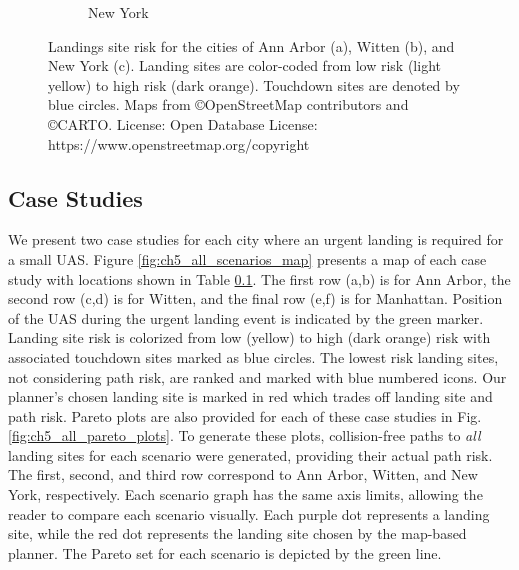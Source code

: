 \begin{figure}[!t]
\begin{subfigure}[b]{0.44\textwidth}
   \caption{New York}\label{fig:ch5_ny_all_risk}
 \end{subfigure}
 \caption[Map of landing site risk]{Landings site risk for the cities of Ann Arbor (a), Witten (b), and New York (c). Landing sites are color-coded from low risk (light yellow) to high risk (dark orange). Touchdown sites are denoted by blue circles. Maps from \copyright OpenStreetMap contributors and \copyright CARTO. License: Open Database License: https://www.openstreetmap.org/copyright}\label{fig:ch5_all_ls_risk}
\end{figure}


\subsection{Case Studies}\label{sec:ch5_case_studies}

We present two case studies for each city where an urgent landing is required for a small UAS.  Figure \ref{fig:ch5_all_scenarios_map} presents a map of each case study with locations shown in Table \ref{sec:ch5_case_studies}. The first row (a,b) is for Ann Arbor, the second row (c,d) is for Witten, and the final row (e,f) is for Manhattan. Position of the \ac{UAS} during the urgent landing event is indicated by the green marker. Landing site risk is colorized from low (yellow) to high (dark orange) risk with associated touchdown sites marked as blue circles. The lowest risk landing sites, not considering path risk, are ranked and marked with blue numbered icons. Our planner's chosen landing site is marked in red which trades off landing site and path risk. 
Pareto plots are also provided for each of these case studies in Fig. \ref{fig:ch5_all_pareto_plots}. To generate these plots, collision-free paths to \textit{all} landing sites for each scenario were generated, providing their actual path risk. The first, second, and third row correspond to Ann Arbor, Witten, and New York, respectively.  Each scenario graph has the same axis limits, allowing the reader to compare each scenario visually. Each purple dot represents a landing site, while the red dot represents the landing site chosen by the map-based planner. The Pareto set for each scenario is depicted by the green line. 


